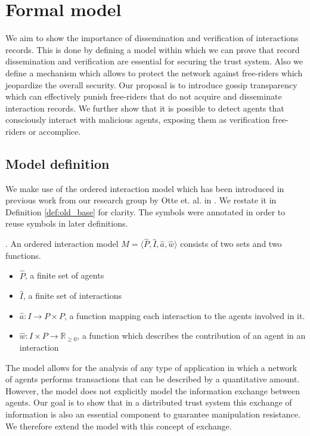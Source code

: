 \chapter{Formal model}
\label{chap:model}
We aim to show the importance of dissemination and verification of interactions 
records. This is done by defining a model within which we can prove that record
dissemination and verification are essential for securing the trust system. Also we define a
mechanism which allows to protect the network against free-riders which 
jeopardize the overall security. Our proposal is to introduce gossip transparency which can 
effectively punish free-riders that do not acquire and disseminate interaction records. We further 
show that it is possible to detect agents that consciously interact with malicious agents, exposing
them as verification free-riders or accomplice.

\section{Model definition}
\label{sec:definitions}
We make use of the ordered interaction model which has been introduced in previous work from 
our research group by Otte et. al. in \cite{OTTE2017}. We restate it in Definition \ref{def:old_base} for clarity.
The symbols were annotated in order to reuse symbols in later definitions.

\begin{defn}. 
    \label{def:old_base}
    An ordered interaction model $\hat M = \langle \hat P, \hat I, \hat a, \hat w \rangle$ consists of two sets and two 
    functions.
    \begin{itemize}
        \item $\hat P$, a finite set of agents
        \item $\hat I$, a finite set of interactions
        \item $\hat a : I \rightarrow P \times P$, a function mapping each interaction to the agents 
        involved in it.
        \item $\hat w : I \times P \rightarrow \mathbb{R}_{\geq0}$, a function which describes the 
        contribution of an agent in an interaction
    \end{itemize}
\end{defn}

The model allows for the analysis of any type of application in which a network of agents performs
transactions that can be described by a quantitative amount. However, the model does not explicitly
model the information exchange between agents. Our goal is to show that in a distributed trust system this 
exchange of information is also an essential component to guarantee manipulation resistance. We 
therefore extend the model with this concept of exchange.

